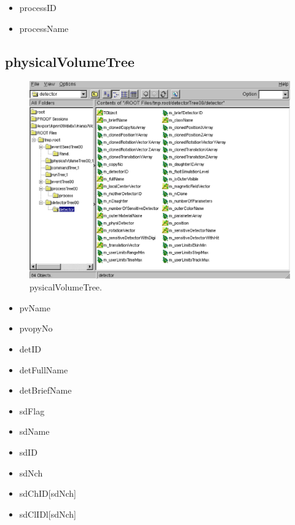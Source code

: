 \documentclass[a4paper,12pt]{article}
\begin{document}
  \begin{itemize}
   \item processID
   \item processName
  \end{itemize}

  \subsection{physicalVolumeTree}
   \begin{figure}[H]
   \begin{center}
    \includegraphics[scale=0.5]{xwd/de.eps}
   \end{center}
    \caption{pysicalVolumeTree.}
   \end{figure}

   \begin{itemize}
    \item pvName
    \item pvopyNo
    \item detID
    \item detFullName
    \item detBriefName
    \item sdFlag
    \item sdName
    \item sdID
    \item sdNch
    \item sdChID[sdNch]
    \item sdClIDl[sdNch]
   \end{itemize}
   
\end{document}
